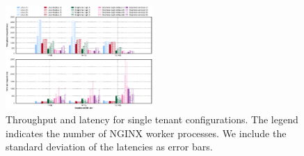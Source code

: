 \begin{figure}[t]
	\centering
    \includegraphics[width=0.5\textwidth]{figs/macrobench-single-tenant-lat-throughput}
	\caption{Throughput and latency for single tenant configurations.
    The legend indicates the number of NGINX worker processes.
    We include the standard deviation of the latencies as error bars.}
	\vspace*{-4pt}
    \label{fig:macrobench-single-tenant-lat-throughput}
\end{figure}
